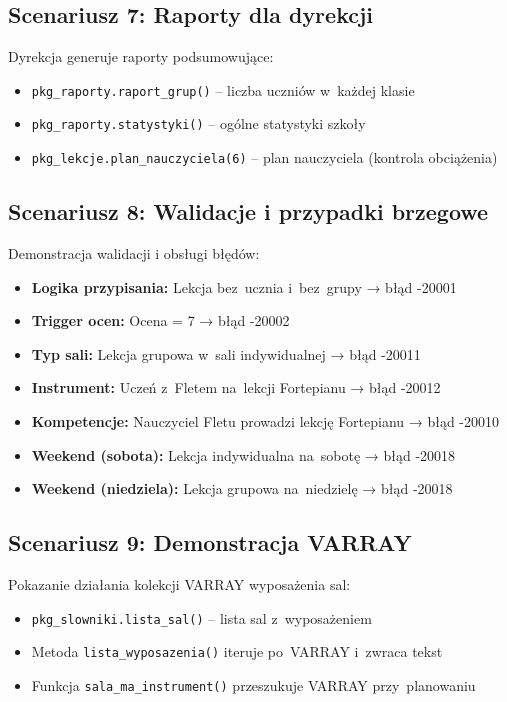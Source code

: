 \documentclass[12pt,a4paper]{article}
\begin{document}
\subsection{Scenariusz 7: Raporty dla dyrekcji}

Dyrekcja generuje raporty podsumowujące:

\begin{itemize}[nosep]
    \item \texttt{pkg\_raporty.raport\_grup()} -- liczba uczniów w~każdej klasie
    \item \texttt{pkg\_raporty.statystyki()} -- ogólne statystyki szkoły
    \item \texttt{pkg\_lekcje.plan\_nauczyciela(6)} -- plan nauczyciela (kontrola obciążenia)
\end{itemize}

\subsection{Scenariusz 8: Walidacje i przypadki brzegowe}

Demonstracja walidacji i obsługi błędów:

\begin{itemize}[nosep]
    \item \textbf{Logika przypisania:} Lekcja bez~ucznia i~bez~grupy → błąd -20001
    \item \textbf{Trigger ocen:} Ocena = 7 → błąd -20002
    \item \textbf{Typ sali:} Lekcja grupowa w~sali indywidualnej → błąd -20011
    \item \textbf{Instrument:} Uczeń z~Fletem na~lekcji Fortepianu → błąd -20012
    \item \textbf{Kompetencje:} Nauczyciel Fletu prowadzi lekcję Fortepianu → błąd -20010
    \item \textbf{Weekend (sobota):} Lekcja indywidualna na~sobotę → błąd -20018
    \item \textbf{Weekend (niedziela):} Lekcja grupowa na~niedzielę → błąd -20018
\end{itemize}

\subsection{Scenariusz 9: Demonstracja VARRAY}

Pokazanie działania kolekcji VARRAY wyposażenia sal:

\begin{itemize}[nosep]
    \item \texttt{pkg\_slowniki.lista\_sal()} -- lista sal z~wyposażeniem
    \item Metoda \texttt{lista\_wyposazenia()} iteruje po~VARRAY i~zwraca tekst
    \item Funkcja \texttt{sala\_ma\_instrument()} przeszukuje VARRAY przy~planowaniu
\end{itemize}
\end{document}
